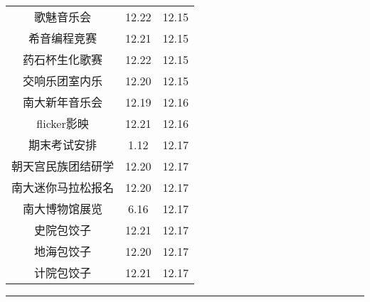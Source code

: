 \documentclass[letterpaper, 12pt]{article}
\begin{document}
\begin{multicols}{2}
{\begin{longtable}{|c|c|c|}
    歌魅音乐会 & 12.22 & 12.15\\
    希音编程竞赛 & 12.21 & 12.15\\
    药石杯生化歌赛 & 12.22 & 12.15\\
    交响乐团室内乐 & 12.20 & 12.15\\
    南大新年音乐会 & 12.19 & 12.16\\
    flicker影映 & 12.21 & 12.16\\
    期末考试安排 & 1.12 & 12.17\\
    朝天宫民族团结研学 & 12.20 & 12.17\\
    南大迷你马拉松报名 & 12.20 & 12.17\\
    南大博物馆展览 & 6.16 & 12.17\\
    史院包饺子 & 12.21 & 12.17\\
    地海包饺子 & 12.20 & 12.17\\
    计院包饺子 & 12.21 & 12.17\\
    \hline
\end{longtable}
\unskip
\unpenalty
\unpenalty}\unvbox\colbbox
\end{multicols}
\hrule
\pagebreak
\end{document}

